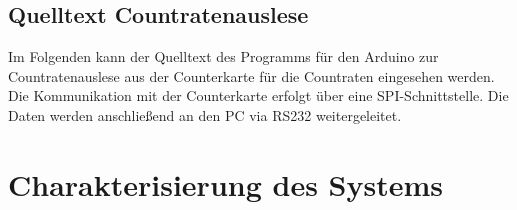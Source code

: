 \section{Quelltext
Countratenauslese}\label{anh:kap:quelltext_arduino_countrate} Im Folgenden kann der Quelltext des Programms für den Arduino zur
Countratenauslese aus der Counterkarte für die Countraten eingesehen werden. Die
Kommunikation mit der Counterkarte erfolgt über eine SPI-Schnittstelle. Die
Daten werden anschließend an den PC via RS232 weitergeleitet.


\chapter{Charakterisierung des Systems}\label{anh:kap:charakterisierung}

